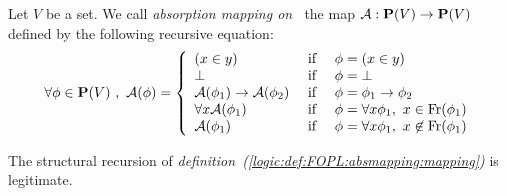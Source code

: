 \begin{defin}\label{logic:def:FOPL:absmapping:mapping}
Let $V$ be a set. We call {\em absorption mapping on \pv\ }the map
${\cal A}:\mbox{${\bf P}(V)$}\to\mbox{${\bf P}(V)$}$ defined by the following recursive equation:
    \[
    \forall\phi\in\pv\ ,\ {\cal A}(\phi)=\left\{
                    \begin{array}{lcl}
                    (x\in y)&\mbox{\ if\ }&\phi=(x\in y)\\
                    \bot&\mbox{\ if\ }&\phi=\bot\\
                    {\cal A}(\phi_{1})\to{\cal A}(\phi_{2})&\mbox{\ if\ }&
                    \phi=\phi_{1}\to\phi_{2}\\
                    \forall x{\cal A}(\phi_{1})&\mbox{\ if\ }&\phi=\forall x\phi_{1},\ x\in\free(\phi_{1})\\
                    {\cal A}(\phi_{1})&\mbox{\ if\ }&\phi=\forall x\phi_{1},\ x\not\in\free(\phi_{1})\\
                    \end{array}\right.
    \]
\end{defin}
\begin{prop}\label{logic:prop:FOPL:absmapping:recursion}
The structural recursion of {\em
definition~(\ref{logic:def:FOPL:absmapping:mapping})} is legitimate.
\end{prop}
